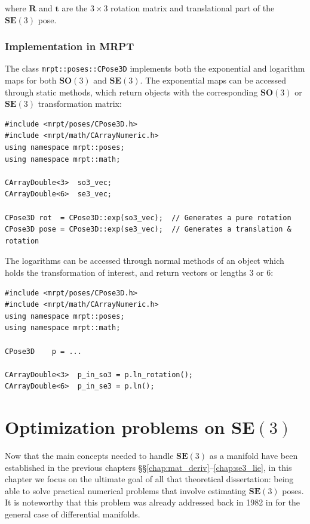 \documentclass[a4paper,11pt]{report}
\begin{document}
\noindent where $\mathbf{R}$ and $\mathbf{t}$ are the $3 \times 3$ rotation matrix
and translational part of the $\mathbf{SE}(3)$ pose.


\subsection{Implementation in MRPT}

The class \texttt{mrpt::poses::CPose3D} implements both the exponential and logarithm
maps for both $\mathbf{SO}(3)$ and $\mathbf{SE}(3)$.
The exponential maps can be accessed through static methods, which return objects
with the corresponding $\mathbf{SO}(3)$ or $\mathbf{SE}(3)$ transformation matrix:

\begin{lstlisting}
#include <mrpt/poses/CPose3D.h>
#include <mrpt/math/CArrayNumeric.h>
using namespace mrpt::poses;
using namespace mrpt::math;

CArrayDouble<3>  so3_vec;
CArrayDouble<6>  se3_vec;

CPose3D rot  = CPose3D::exp(so3_vec);  // Generates a pure rotation
CPose3D pose = CPose3D::exp(se3_vec);  // Generates a translation & rotation
\end{lstlisting}


The logarithms can be accessed through normal methods of an object which
holds the transformation of interest, and return vectors or lengths 3 or 6:

\begin{lstlisting}
#include <mrpt/poses/CPose3D.h>
#include <mrpt/math/CArrayNumeric.h>
using namespace mrpt::poses;
using namespace mrpt::math;

CPose3D    p = ...

CArrayDouble<3>  p_in_so3 = p.ln_rotation();
CArrayDouble<6>  p_in_se3 = p.ln();
\end{lstlisting}




\chapter{Optimization problems on $\mathbf{SE}(3)$}
\label{ch:se3_optim}

Now that the main concepts needed to handle $\mathbf{SE}(3)$
as a manifold have been established in
the previous chapters \S\S\ref{chap:mat_deriv}--\ref{chap:se3_lie},
in this chapter we focus on the ultimate goal of all that theoretical
dissertation: being able to solve practical numerical
problems that involve
estimating $\mathbf{SE}(3)$ poses.
It is noteworthy that this problem was already addressed back in 1982 in \cite{gabay1982mdf} for the general case of differential manifolds.
\end{document}
